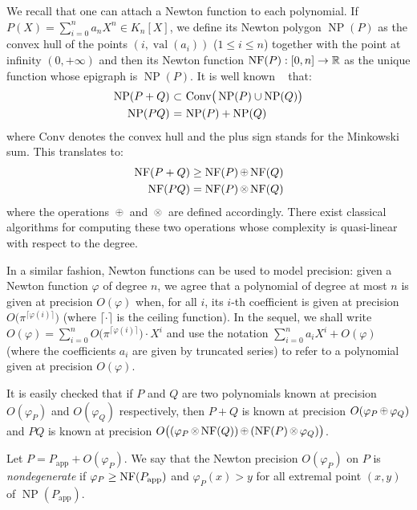 \documentclass{sig-alternate-2013}
\DeclareMathOperator{\NP}{NP}
\DeclareMathOperator{\val}{val}
\newcommand{\R}{\mathbb R}
\newcommand{\NF}{\text{\rm NF}}
\newcommand{\nfop}[1]{%
\raisebox{-0.1mm}{\begin{tikzpicture}
\draw[transparent] (-0.18,0)--(0.18,0);
\draw[very thin] (0,0) circle (0.11cm);
\begin{scope}
\clip (0,0) circle (0.11cm);
\node[scale=0.75] at (0,0) { $#1$ };
\end{scope}
\end{tikzpicture}}}
\newcommand{\nfplus}{\nfop+}
\newcommand{\nftimes}{\nfop\times}
\newcommand{\app}{\textrm{app}}
\def\todo#1{\ \!\!{\color{red} #1}}
\begin{document}
We recall that one can attach a Newton function to each polynomial.
If $P(X) = \sum_{i=0}^n a_n X^n \in K_n[X]$, we define its Newton
polygon $\NP(P)$ as the convex hull of the points $(i,\val(a_i))$ 
($1 \leq i \leq n$) together with the point at infinity $(0,+\infty)$
and then its Newton function $\NF(P) : [0,n] \to \R$ as the unique
function whose epigraph is $\NP(P)$. It is well known \todo{(Give a
reference?)} that:
$$\begin{array}{r@{\,\,}c@{\,\,}l}
\NP(P+Q) & \subset & \text{Conv}\big(\NP(P) \cup \NP(Q)\big) \smallskip \\
\NP(PQ) & = & \NP(P) + \NP(Q)
\end{array}$$
where $\text{Conv}$ denotes the convex hull and the plus sign stands 
for the Minkowski sum. This translates to:
$$\begin{array}{r@{\,\,}c@{\,\,}l}
\NF(P+Q) \geq \NF(P) \nfplus \NF(Q) \smallskip \\
\NF(PQ) = \NF(P) \nftimes \NF(Q)
\end{array}$$
where the operations $\nfplus$ and $\nftimes$ are defined accordingly.
There exist classical algorithms for computing these two operations
whose complexity is quasi-linear with respect to the degree.

In a similar fashion, Newton functions can be used to model precision: 
given a Newton function $\varphi$ of degree $n$, we agree that a polynomial 
of degree at most $n$ is given at precision $O(\varphi)$ when, for all $i$,
its $i$-th coefficient is given at precision $O\big(\pi^{\lceil \varphi(i)
\rceil}\big)$ (where $\lceil \cdot \rceil$ is the ceiling function).
In the sequel, we shall write
$O(\varphi) = \sum_{i=0}^n O\big(\pi^{\lceil \varphi(i) \rceil}\big) \cdot X^i$
and use the notation $\sum_{i=0}^n a_i X^i + O(\varphi)$ (where the
coefficients $a_i$ are given by truncated series) to refer to a 
polynomial given at precision $O(\varphi)$.

It is easily checked that if $P$ and $Q$ are two polynomials known at 
precision $O(\varphi_P)$ and $O(\varphi_Q)$ respectively, then $P+Q$ is 
known at precision $O(\varphi_P \nfplus \varphi_Q)$ and $PQ$ is known at 
precision $O\big((\varphi_P \nftimes \NF(Q)) \nfplus (\NF(P) \nftimes 
\varphi_Q)\big)$.

\begin{deftn}
\label{def:nondeg}
Let $P = P_\app + O(\varphi_P)$. We say that the Newton precision 
$O(\varphi_P)$ on $P$ is \emph{nondegenerate} if $\varphi_P \geq 
\NF(P_\app)$ and $\varphi_P(x) > y$ for all extremal point $(x,y)$ of 
$\NP(P_\app)$.
\end{deftn}
\end{document}
